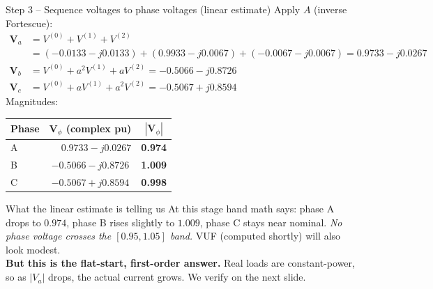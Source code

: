 \documentclass[aspectratio=169,10pt]{beamer}
\begin{document}
\begin{frame}[shrink=4]{Step 3 -- Sequence voltages to phase voltages (linear estimate)}
Apply $A$ (inverse Fortescue):
\begin{align*}
\mathbf{V}_a &= V^{(0)} + V^{(1)} + V^{(2)} \\
             &= (-0.0133 - j0.0133) + (0.9933 - j0.0067) + (-0.0067 - j0.0067) = 0.9733 - j0.0267 \\
\mathbf{V}_b &= V^{(0)} + a^2 V^{(1)} + a V^{(2)} = -0.5066 - j0.8726 \\
\mathbf{V}_c &= V^{(0)} + a V^{(1)} + a^2 V^{(2)} = -0.5067 + j0.8594
\end{align*}
\vspace{0.3em}
Magnitudes:
\centering
\small
\begin{tabular}{lcc}
\toprule
Phase & $\mathbf{V}_\phi$ (complex pu) & $|\mathbf{V}_\phi|$ \\
\midrule
A & $\phantom{-}0.9733 - j0.0267$ & \textbf{0.974} \\
B & $-0.5066 - j0.8726$ & \textbf{1.009} \\
C & $-0.5067 + j0.8594$ & \textbf{0.998} \\
\bottomrule
\end{tabular}
\vspace{0.4em}
\begin{alertblock}{What the linear estimate is telling us}
At this stage hand math says: phase A drops to $0.974$, phase B rises slightly to $1.009$, phase C stays near nominal. \emph{No phase voltage crosses the $[0.95, 1.05]$ band.} VUF (computed shortly) will also look modest.
\\[0.3em]
\textbf{But this is the flat-start, first-order answer.} Real loads are constant-power, so as $|V_a|$ drops, the actual current grows. We verify on the next slide.
\end{alertblock}
\end{frame}
\end{document}
